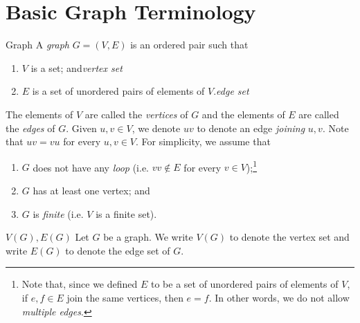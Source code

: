 \documentclass[co342]{subfiles}
\begin{document}

    \section{Basic Graph Terminology}
    
    \begin{definition}{Graph}{}
        A \emph{graph} $G = \left( V,E \right)$ is an ordered pair such that
        \begin{enumerate}
            \item $V$ is a set; and\hfill\textit{vertex set}
            \item $E$ is a set of unordered pairs of elements of $V$.\hfill\textit{edge set}
        \end{enumerate}
        The elements of $V$ are called the \emph{vertices} of $G$ and the elements of $E$ are called the \emph{edges} of $G$. Given $u,v\in V$, we denote $uv$ to denote an edge \emph{joining} $u,v$. Note that $uv=vu$ for every $u,v\in V$. For simplicity, we assume that
        \begin{enumerate}
            \item $G$ does not have any \emph{loop} (i.e. $vv\notin E$ for every $v\in V$);\footnote{Note that, since we defined $E$ to be a set of unordered pairs of elements of $V$, if $e,f\in E$ join the same vertices, then $e=f$. In other words, we do not allow \emph{multiple edges}.} 
            \item $G$ has at least one vertex; and
            \item $G$ is \emph{finite} (i.e. $V$ is a finite set).
        \end{enumerate}
    \end{definition}

    \begin{notation}{$V\left( G \right) , E\left( G \right)$}{}
        Let $G$ be a graph. We write $V\left( G \right)$ to denote the vertex set and write $E\left( G \right)$ to denote the edge set of $G$.
    \end{notation}
\end{document}
